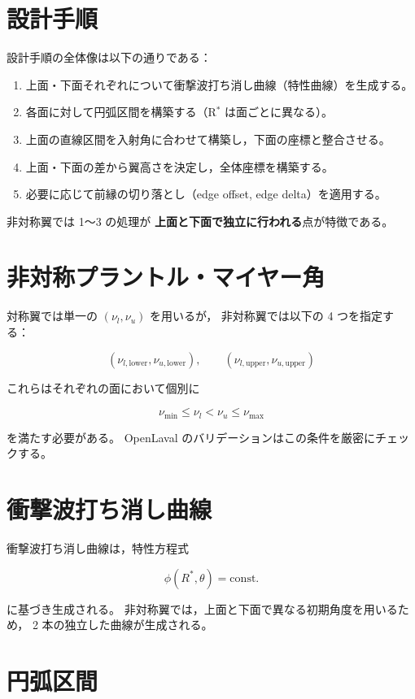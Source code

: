 \section{設計手順}

設計手順の全体像は以下の通りである：

\begin{enumerate}
  \item 上面・下面それぞれについて衝撃波打ち消し曲線（特性曲線）を生成する。
  \item 各面に対して円弧区間を構築する（R$^\ast$ は面ごとに異なる）。
  \item 上面の直線区間を入射角に合わせて構築し，下面の座標と整合させる。
  \item 上面・下面の差から翼高さを決定し，全体座標を構築する。
  \item 必要に応じて前縁の切り落とし（edge offset, edge delta）を適用する。
\end{enumerate}

非対称翼では 1〜3 の処理が
\textbf{上面と下面で独立に行われる}点が特徴である。

\section{非対称プラントル・マイヤー角}

対称翼では単一の $(\nu_l, \nu_u)$ を用いるが，
非対称翼では以下の 4 つを指定する：



\[
(\nu_{l,\mathrm{lower}}, \nu_{u,\mathrm{lower}}), \qquad
(\nu_{l,\mathrm{upper}}, \nu_{u,\mathrm{upper}})
\]



これらはそれぞれの面において個別に


\[
\nu_{\min} \le \nu_l < \nu_u \le \nu_{\max}
\]


を満たす必要がある。
OpenLaval のバリデーションはこの条件を厳密にチェックする。

\section{衝撃波打ち消し曲線}

衝撃波打ち消し曲線は，特性方程式


\[
\phi(R^\ast,\theta) = \mathrm{const.}
\]


に基づき生成される。
非対称翼では，上面と下面で異なる初期角度を用いるため，
2 本の独立した曲線が生成される。

\section{円弧区間}

